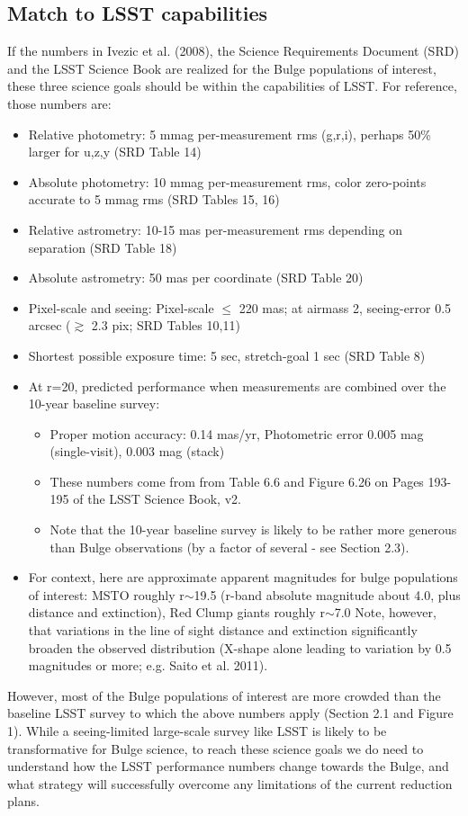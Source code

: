 \subsection{Match to LSST capabilities}
If the numbers in Ivezic et al. (2008), the Science Requirements Document (SRD) and the LSST Science Book are realized for the Bulge populations of interest, these three science goals should be within the capabilities of LSST. For reference, those numbers are: 
\begin{itemize}
\item Relative photometry: 5 mmag per-measurement rms (g,r,i), perhaps 50\% larger for u,z,y (SRD Table 14) 
\item Absolute photometry: 10 mmag per-measurement rms, color zero-points accurate to 5 mmag rms (SRD 
Tables 15, 16) 
\item Relative astrometry: 10-15 mas per-measurement rms depending on separation (SRD Table 18) 
\item Absolute astrometry: 50 mas per coordinate (SRD Table 20) 
\item Pixel-scale and seeing: Pixel-scale $\le$ 220 mas; at airmass 2, 
seeing-error 0.5 arcsec ($\gtrsim$ 2.3 pix; SRD 
Tables 10,11) 
\item Shortest possible exposure time: 5 sec, stretch-goal 1 sec (SRD Table 8) 
\item{At r=20, predicted performance when measurements are combined over the 10-year baseline survey:
\begin{itemize} 
\item Proper motion accuracy: 0.14 mas/yr, Photometric error 0.005 mag (single-visit), 0.003 mag (stack) 
\item These numbers come from from Table 6.6 and Figure 6.26 on Pages 193-195 of the LSST Science Book, v2. 
\item Note that the 10-year baseline survey is likely to be rather more generous than Bulge observations (by a factor of several - see Section 2.3). 
\end{itemize}
}
\item{For context, here are approximate apparent magnitudes for bulge populations of interest: MSTO roughly r$\sim$19.5 (r-band absolute magnitude about 4.0, plus distance and extinction), Red Clump giants roughly r$\sim$7.0 Note, however, that variations in the line of sight distance and extinction significantly broaden the observed distribution (X-shape alone leading to variation by 0.5 magnitudes or more; e.g. Saito et al. 2011). }
\end{itemize}
However, most of the Bulge populations of interest are more crowded than the baseline LSST survey to which the 
above numbers apply (Section 2.1 and Figure 1). 
While a seeing-limited large-scale survey like LSST is likely to be transformative for Bulge science, to reach these science goals we do need to understand how the LSST performance numbers change towards the Bulge, and what strategy will successfully overcome any limitations of the current reduction plans. 

